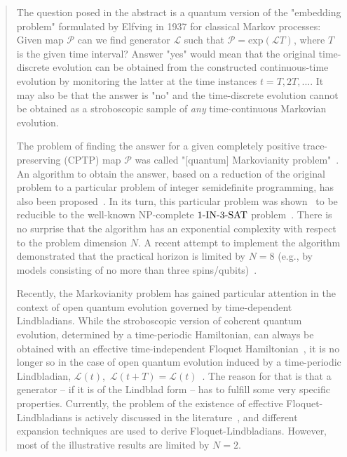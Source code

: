 \documentclass[%
 aip,
 floatfix,
 amsmath,amssymb,
 reprint,%
]{revtex4-1}
\begin{document}
\maketitle

\begin{quotation}
The question posed in the abstract is a quantum version of the "embedding problem" formulated by Elfving in 1937 \cite{elfing} for classical Markov processes: Given map $\mathcal{P}$ can we find  generator $\mathcal{L}$ such that $\mathcal{P} = \mathrm{exp}(\mathcal{L}T)$, where $T$ is the given time interval? Answer "yes" would mean that the original time-discrete evolution can be obtained from the constructed continuous-time evolution  by monitoring the latter at the time instances $t=T,2T,...$. It may also be  that the answer is "no" and the time-discrete evolution cannot be obtained as a stroboscopic sample of \emph{any} time-continuous Markovian evolution.


The  problem of finding the answer for a given completely positive trace-preserving (CPTP) map  $\mathcal{P}$ was called "[quantum] Markovianity problem"~\cite{X1}. An algorithm to obtain the answer, based on a reduction of the original problem  to a particular problem of integer semidefinite programming, has also been proposed~\cite{X1}. In its turn, this particular problem was shown~\cite{X2} to be reducible to the well-known NP-complete $\mathrm{1{\text -}IN{\text -}3{\text -}SAT}$ problem~\cite{np}. There is no surprise that the algorithm has an exponential complexity with respect to the  problem dimension $N$. A recent attempt to implement the algorithm demonstrated that the practical horizon is limited by $N = 8$ (e.g., by models consisting of no more than three spins/qubits)~\cite{unpub}.

Recently, the Markovianity problem has gained particular attention in the context  of open quantum evolution governed by time-dependent Lindbladians. While
the stroboscopic version of coherent quantum evolution, determined by a time-periodic Hamiltonian, can always be obtained with an effective  time-independent Floquet Hamiltonian~\cite{Holthaus2015,Bukov2015}, it is no longer so in the case of open quantum evolution induced by a time-periodic Lindbladian, $\mathcal{L}(t)$,~$\mathcal{L}(t+T)= \mathcal{L}(t)$~\cite{X3}.
The reason for that is that a generator -- if it is of the Lindblad form -- has to fulfill some very specific properties. Currently, the problem of the existence  of effective Floquet-Lindbladians is actively discussed in the literature~\cite{X4,X5,X6,X7,X8,X9}, and different expansion techniques are used to derive Floquet-Lindbladians. 
However, most of the  illustrative results are limited by $N=2$.


\end{quotation}
\end{document}
